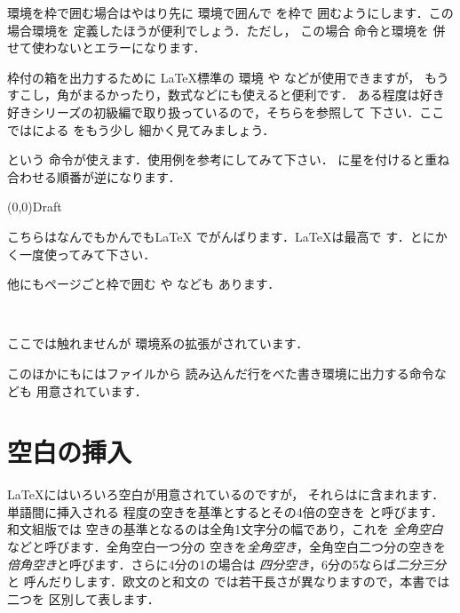 環境を枠で囲む場合はやはり先に
環境で囲んで を枠で
囲むようにします．この場合環境を
定義したほうが便利でしょう．ただし，
この場合 命令と環境を
併せて使わないとエラーになります．


枠付の箱を出力するために \LaTeX 標準の 環境
や  などが使用できますが，
もうすこし，角がまるかったり，数式などにも使えると便利です．
ある程度は好き好きシリーズの初級編で取り扱っているので，そちらを参照して
下さい．ここではによる  をもう少し
細かく見てみましょう．
\begin{Syntax}
\end{Syntax}
という  命令が使えます．使用例を参考にしてみて下さい．
 に星を付けると重ね合わせる順番が逆になります．
\begin{InOut}
\usepackage{fancybox,color}
\boxput(0,0){\color{blue}\Huge Draft}
{\color{red}\parbox{\linewidth}{%
こちらはなんでもかんでも\LaTeX 
でがんばります．\LaTeX は最高で
す．とにかく一度使ってみて下さい．}}
\end{InOut}
他にもページごと枠で囲む  や  なども
あります．
\begin{Syntax}
 \\
\end{Syntax}
ここでは触れませんが  環境系の拡張がされています．


このほかにもにはファイルから
読み込んだ行をべた書き環境に出力する命令なども
用意されています．





\section{空白の挿入}
{\LaTeX}にはいろいろ空白が用意されているのですが，
それらは{}に含まれます．単語間に挿入される
程度の空きを基準とするとその4倍の空きを
と呼びます．和文組版では
空きの基準となるのは全角1文字分の幅であり，これを
\emph{全角空白}などと呼びます．全角空白一つ分の
空きを\emph{全角空き}，全角空白二つ分の空きを
\emph{倍角空き}と呼びます．さらに4分の1の場合は
\emph{四分空き}，6分の5ならば\emph{二分三分}と
呼んだりします．欧文のと和文の
では若干長さが異なりますので，本書では二つを
区別して表します．

